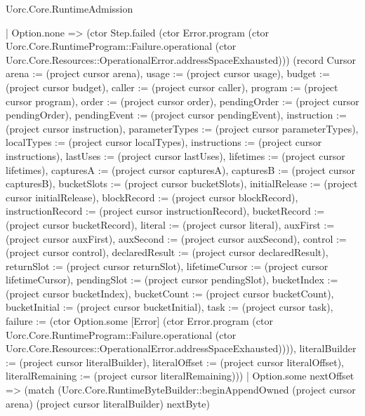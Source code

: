 \begin{lexlean}{Uorc.Core.RuntimeAdmission}
\begin{semanticmodule}
{              | Option.none => (ctor Step.failed (ctor Error.program (ctor Uorc.Core.RuntimeProgram::Failure.operational (ctor Uorc.Core.Resources::OperationalError.addressSpaceExhausted))) (record Cursor {arena := (project cursor arena), usage := (project cursor usage), budget := (project cursor budget), caller := (project cursor caller), program := (project cursor program), order := (project cursor order), pendingOrder := (project cursor pendingOrder), pendingEvent := (project cursor pendingEvent), instruction := (project cursor instruction), parameterTypes := (project cursor parameterTypes), localTypes := (project cursor localTypes), instructions := (project cursor instructions), lastUses := (project cursor lastUses), lifetimes := (project cursor lifetimes), capturesA := (project cursor capturesA), capturesB := (project cursor capturesB), bucketSlots := (project cursor bucketSlots), initialRelease := (project cursor initialRelease), blockRecord := (project cursor blockRecord), instructionRecord := (project cursor instructionRecord), bucketRecord := (project cursor bucketRecord), literal := (project cursor literal), auxFirst := (project cursor auxFirst), auxSecond := (project cursor auxSecond), control := (project cursor control), declaredResult := (project cursor declaredResult), returnSlot := (project cursor returnSlot), lifetimeCursor := (project cursor lifetimeCursor), pendingSlot := (project cursor pendingSlot), bucketIndex := (project cursor bucketIndex), bucketCount := (project cursor bucketCount), bucketInitial := (project cursor bucketInitial), task := (project cursor task), failure := (ctor Option.some [Error] (ctor Error.program (ctor Uorc.Core.RuntimeProgram::Failure.operational (ctor Uorc.Core.Resources::OperationalError.addressSpaceExhausted)))), literalBuilder := (project cursor literalBuilder), literalOffset := (project cursor literalOffset), literalRemaining := (project cursor literalRemaining)}))
              | Option.some nextOffset => (match (Uorc.Core.RuntimeByteBuilder::beginAppendOwned (project cursor arena) (project cursor literalBuilder) nextByte)
}
\end{semanticmodule}
\end{lexlean}
